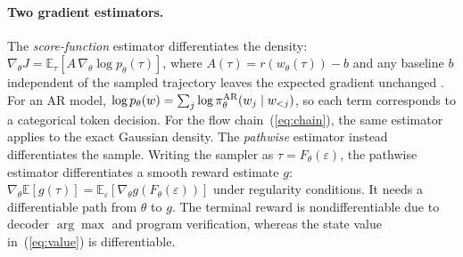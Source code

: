 \paragraph{Two gradient estimators.}
The \emph{score-function} estimator differentiates the density: $\nabla_\theta J=\mathbb E_\tau[A\,\nabla_\theta\log p_\theta(\tau)]$, where $A(\tau)=r(w_\theta(\tau))-b$ and any baseline $b$ independent of the sampled trajectory leaves the expected gradient unchanged \citep{williams1992reinforce}. For an AR model, $\log p_\theta(w)=\sum_j\log\pi^{\rm AR}_\theta(w_j\mid w_{<j})$, so each term corresponds to a categorical token decision. For the flow chain~(\ref{eq:chain}), the same estimator applies to the exact Gaussian density. The \emph{pathwise} estimator instead differentiates the sample. Writing the sampler as $\tau=F_\theta(\varepsilon)$, the pathwise estimator differentiates a smooth reward estimate $g$: $\nabla_\theta\mathbb E[g(\tau)]=\mathbb E_\varepsilon[\nabla_\theta g(F_\theta(\varepsilon))]$ under regularity conditions. It needs a differentiable path from $\theta$ to $g$. The terminal reward is nondifferentiable due to decoder $\arg\max$ and program verification, whereas the state value in~(\ref{eq:value}) is differentiable.

